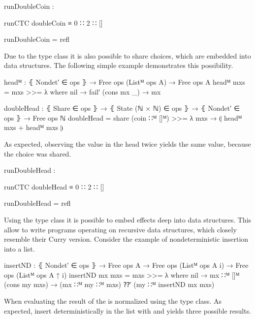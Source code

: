 \begin{center}
\begin{code}
runDoubleCoin :
\end{code}
\begin{code}[inline]
 runCTC doubleCoin ≡ 0 ∷ 2 ∷ []
\end{code}
\begin{code}
runDoubleCoin = refl
\end{code}
\end{center}
Due to the  type class it is also possible to share
choices, which are embedded into data structures.
The following simple example demonstrates this possibility.

\begin{code}
headᴹ : ⦃ Nondet′ ∈ ops ⦄ → Free ops (Listᴹ ops A) → Free ops A
headᴹ mxs = mxs >>= λ where
  nil         → fail′
  (cons mx _) → mx

doubleHead : ⦃ Share ∈ ops ⦄ → ⦃ State (ℕ × ℕ) ∈ ops ⦄ → ⦃ Nondet′ ∈ ops ⦄ →
  Free ops ℕ
doubleHead = share (coin ∷ᴹ []ᴹ) >>= λ mxs → ⦇ headᴹ mxs + headᴹ mxs ⦈
\end{code}
As expected, observing the value in the head twice yields the same value,
because the choice was shared.

\begin{center}
\begin{code}
runDoubleHead :
\end{code}
\begin{code}[inline]
 runCTC doubleHead ≡ 0 ∷ 2 ∷ []
\end{code}
\begin{code}
runDoubleHead = refl
\end{code}
\end{center}
Using the  type class it is possible to embed effects
deep into data structures.
This allow to write programs operating on recursive data structures, which
closely resemble their Curry version.
Consider the example of nondeterministic insertion into a list.

\begin{code}
insertND : ⦃ Nondet′ ∈ ops ⦄ →
  Free ops A → Free ops (Listᴹ ops A {i}) → Free ops (Listᴹ ops A {↑ i})
insertND mx mxs = mxs >>= λ where
  nil            → mx ∷ᴹ []ᴹ
  (cons my mxs)  → (mx ∷ᴹ my ∷ᴹ mxs) ⁇′ (my ∷ᴹ insertND mx mxs)
\end{code}
When evaluating the result of  the 
is normalized using the type class.
As expected, insert  deterministically in the list with
 and  yields three possible results.

